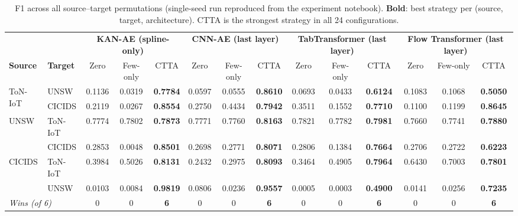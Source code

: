 \documentclass[10pt, conference, letterpaper]{IEEEtran}
\begin{document}
\begin{table}[t]
\centering
\caption{F1 across all source--target permutations (single-seed run reproduced from the experiment notebook).
  \textbf{Bold}: best strategy per (source, target, architecture).
  CTTA is the strongest strategy in all 24 configurations.}
\label{tab:main_results}
\setlength{\tabcolsep}{4pt}
\begin{tabular}{l|l|ccc|ccc|ccc|ccc}
\toprule
& & \multicolumn{3}{c|}{\textbf{KAN-AE (spline-only)}} & \multicolumn{3}{c|}{\textbf{CNN-AE (last layer)}} & \multicolumn{3}{c|}{\textbf{TabTransformer (last layer)}} & \multicolumn{3}{c}{\textbf{Flow Transformer (last layer)}} \\
\textbf{Source} & \textbf{Target} & Zero & Few-only & CTTA & Zero & Few-only & CTTA & Zero & Few-only & CTTA & Zero & Few-only & CTTA \\
\midrule
\multirow{2}{*}{ToN-IoT}
    & UNSW    & 0.1136 & 0.0319 & \textbf{0.7784} & 0.0597 & 0.0555 & \textbf{0.8610} & 0.0693 & 0.0433 & \textbf{0.6124} & 0.1083 & 0.1068 & \textbf{0.5050} \\
    & CICIDS  & 0.2119 & 0.0267 & \textbf{0.8554} & 0.2750 & 0.4434 & \textbf{0.7942} & 0.3511 & 0.1552 & \textbf{0.7710} & 0.1100 & 0.1199 & \textbf{0.8645} \\
\midrule
\multirow{2}{*}{UNSW}
    & ToN-IoT & 0.7774 & 0.7802 & \textbf{0.7873} & 0.7771 & 0.7760 & \textbf{0.8163} & 0.7821 & 0.7782 & \textbf{0.7981} & 0.7660 & 0.7741 & \textbf{0.7880} \\
    & CICIDS  & 0.2853 & 0.0048 & \textbf{0.8501} & 0.2698 & 0.2771 & \textbf{0.8071} & 0.2806 & 0.1384 & \textbf{0.7664} & 0.2706 & 0.2722 & \textbf{0.6223} \\
\midrule
\multirow{2}{*}{CICIDS}
    & ToN-IoT & 0.3984 & 0.5026 & \textbf{0.8131} & 0.2432 & 0.2975 & \textbf{0.8093} & 0.3464 & 0.4905 & \textbf{0.7964} & 0.6430 & 0.7003 & \textbf{0.7801} \\
    & UNSW    & 0.0103 & 0.0084 & \textbf{0.9819} & 0.0806 & 0.0236 & \textbf{0.9557} & 0.0005 & 0.0003 & \textbf{0.4900} & 0.0141 & 0.0256 & \textbf{0.7235} \\
\midrule
\multicolumn{2}{l|}{\textit{Wins (of 6)}} & 0 & 0 & \textbf{6} & 0 & 0 & \textbf{6} & 0 & 0 & \textbf{6} & 0 & 0 & \textbf{6} \\
\bottomrule
\end{tabular}
\end{table}
\end{document}

